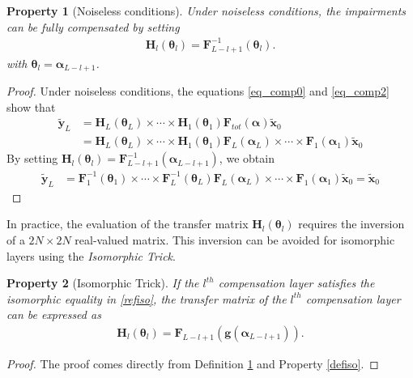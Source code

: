 \documentclass{article}
\newtheorem{property}{Property}
\begin{document}
\begin{property}[Noiseless conditions]\label{propnoiseless}
Under noiseless conditions, the impairments can be fully compensated by setting
\begin{align}
 \mathbf{H}_{l}(\boldsymbol \theta_l) = \mathbf{F}_{L-l+1}^{-1}(\boldsymbol \theta_l).
\end{align}
with $\boldsymbol \theta_l=\boldsymbol \alpha_{L-l+1}$.
\end{property}
\begin{proof}
Under noiseless conditions, the equations \eqref{eq_comp0} and \eqref{eq_comp2} show that
\begin{align*}
\tilde{\mathbf{y}}_{L}&=\mathbf{H}_L(\boldsymbol  \theta_L)\times \cdots \times \mathbf{H}_{1}(\boldsymbol  \theta_1) \mathbf{F}_{tot}(\boldsymbol \alpha)\tilde{\mathbf{x}}_{0}\\
&= \mathbf{H}_L(\boldsymbol  \theta_L)\times \cdots \times \mathbf{H}_{1}(\boldsymbol  \theta_1)\mathbf{F}_{L}(\boldsymbol  \alpha_L)\times \cdots \times \mathbf{F}_{1}(\boldsymbol  \alpha_1)\tilde{\mathbf{x}}_{0}
\end{align*}
By setting $ \mathbf{H}_{l}(\boldsymbol \theta_l) = \mathbf{F}_{L-l+1}^{-1}(\boldsymbol \alpha_{L-l+1})$, we obtain
\begin{align*}
\tilde{\mathbf{y}}_{L}&= \mathbf{F}_{1}^{-1}(\boldsymbol  \theta_1)\times \cdots \times \mathbf{F}_{L}^{-1}(\boldsymbol  \theta_L)\mathbf{F}_{L}(\boldsymbol  \alpha_L)\times \cdots \times \mathbf{F}_{1}(\boldsymbol  \alpha_1)\tilde{\mathbf{x}}_{0}=\tilde{\mathbf{x}}_{0}
\end{align*}
\end{proof}

In practice, the evaluation of the transfer matrix $ \mathbf{H}_{l}(\boldsymbol \theta_l)$ requires the inversion of a $2N\times 2N$ real-valued matrix. This inversion can be avoided for isomorphic layers using the \emph{Isomorphic Trick}.

\begin{property}[Isomorphic Trick] If the $l^{th}$ compensation layer satisfies the isomorphic equality in \eqref{refiso}, the transfer matrix of the $l^{th}$ compensation layer can be expressed as
\begin{align}
 \mathbf{H}_{l}(\boldsymbol \theta_l) = \mathbf{F}_{L-l+1}(\mathbf{g}(\boldsymbol \alpha_{L-l+1})).
\end{align}
\end{property}
\begin{proof}
The proof comes directly from Definition \ref{propnoiseless} and Property \ref{defiso}. 
\end{proof}
\end{document}
